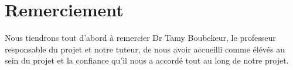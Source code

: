 \documentclass[a4paper,12pt]{article}
\def \ttprofname{Prof \textordmasculine.~Dr \textordmasculine.Tamy Boubekeur} %
\def \ttauthi{Tiago~Chedraoui~Silva} %
\def \ttdate{Juillet 25, 2013} %
\begin{document}
\thispagestyle{empty}
\titleTMB 


\newpage
\section*{Remerciement}
Nous tiendrons tout d’abord à remercier Dr Tamy Boubekeur, le
professeur responsable du projet et notre tuteur, de nous avoir
accueilli comme élévés au sein du projet et la confiance qu’il nous a
accordé tout au long de notre projet. 
\end{document}
